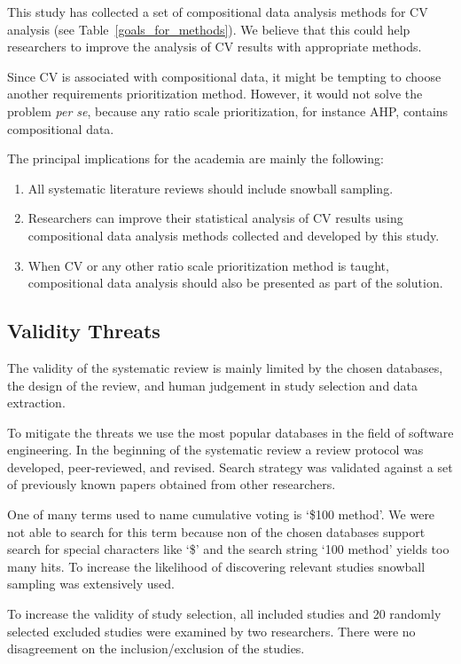 This study has collected a set of compositional data analysis methods for CV analysis (see Table~\ref{goals_for_methods}). 
We believe that this could help researchers to improve the analysis of CV results with appropriate methods.

Since CV is associated with compositional data, it might be tempting to choose another requirements prioritization method. However, it would not solve the problem \emph{per se}, because any ratio scale prioritization, for instance AHP, contains compositional data.

The principal implications for the academia are mainly the following:

\begin{enumerate}
\item All systematic literature reviews should include snowball sampling.
\item Researchers can improve their statistical analysis of CV results using compositional data analysis methods collected and developed by this study.
\item When CV or any other ratio scale prioritization method is taught, compositional data analysis should also be presented as part of the solution.
\end{enumerate}	

\subsection{Validity Threats}
The validity of the systematic review is mainly limited by the chosen databases, the design of the review, and human judgement in study selection and data extraction.

To mitigate the threats we use the most popular databases in the field of software engineering.
In the beginning of the systematic review a review protocol was developed, peer-reviewed, and revised.
Search strategy was validated against a set of previously known papers obtained from other researchers.

One of many terms used to name cumulative voting is `\$100 method'.
We were not able to search for this term because non of the chosen databases support search for special characters like `\$' and the search string `100 method' yields too many hits.
To increase the likelihood of discovering relevant studies snowball sampling was extensively used.

To increase the validity of study selection, all included studies and 20 randomly selected excluded studies were examined by two researchers.
There were no disagreement on the inclusion\slash exclusion of the studies.

